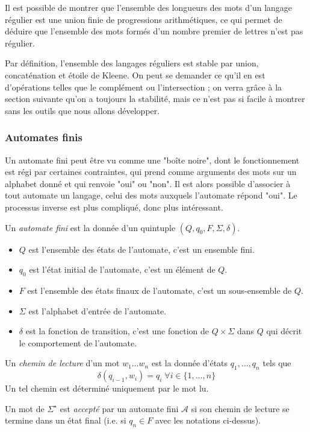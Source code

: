 Il est possible de montrer que l'ensemble des longueurs des mots d'un langage régulier est une union finie de progressions arithmétiques, ce qui permet de déduire que l'ensemble des mots formés d'un nombre premier de lettres n'est pas régulier.

Par définition, l'ensemble des langages réguliers est stable par union, concaténation et étoile de Kleene. On peut se demander ce qu'il en est d'opérations telles que le complément ou l'intersection ; on verra grâce à la section suivante qu'on a toujours la stabilité, mais ce n'est pas si facile à montrer sans les outils que nous allons développer.



\subsubsection{Automates finis}
Un automate fini peut être vu comme une "boîte noire", dont le fonctionnement est régi par certaines contraintes, qui prend comme arguments des mots sur un alphabet donné et qui renvoie "oui" ou "non". Il est alors possible d'associer à tout automate un langage, celui des mots auxquels l'automate répond "oui". Le processus inverse est plus compliqué, donc plus intéressant.

\begin{dfn}
Un \emph{automate fini} est la donnée d'un quintuple $(Q, q_0, F, \Sigma, \delta)$.
\begin{itemize}
\item $Q$ est l'ensemble des états de l'automate, c'est un ensemble fini.
\item $q_0$ est l'état initial de l'automate, c'est un élément de $Q$.
\item $F$ est l'ensemble des états finaux de l'automate, c'est un sous-ensemble de $Q$.
\item $\Sigma$ est l'alphabet d'entrée de l'automate.
\item $\delta$ est la fonction de transition, c'est une fonction de $Q\times\Sigma$ dans $Q$ qui décrit le comportement de l'automate.
\end{itemize}

Un \emph{chemin de lecture} d'un mot $w_1\dots w_n$ est la donnée d'états $q_1, \dots, q_n$ tels que
$$\delta(q_{i - 1}, w_i) = q_i\;\forall i\in \{1, \dots, n\}$$
Un tel chemin est déterminé uniquement par le mot lu.

Un mot de $\Sigma^\star$ est \emph{accepté} par un automate fini $\mathcal A$ si son chemin de lecture se termine dans un état final (i.e. si $q_n\in F$ avec les notations ci-dessus).
\end{dfn}

